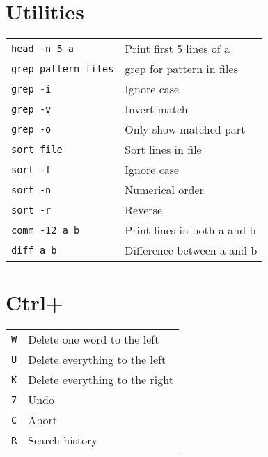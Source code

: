 \documentclass[a4paper, twocolumn]{article}
\renewcommand{\tt}{\texttt}
\begin{document}
\section{Utilities}
\begin{tabular}{ll}
    \tt{head -n 5 a}        & Print first 5 lines of a              \\
    \tt{grep pattern files} & grep for pattern in files             \\
    \tt{grep -i}            & Ignore case                           \\
    \tt{grep -v}            & Invert match                          \\
    \tt{grep -o}            & Only show matched part                \\
    \tt{sort file}          & Sort lines in file                    \\
    \tt{sort -f}            & Ignore case                           \\
    \tt{sort -n}            & Numerical order                       \\
    \tt{sort -r}            & Reverse                               \\
    \tt{comm -12 a b}       & Print lines in both a and b           \\
    \tt{diff a b}           & Difference between a and b
\end{tabular}

\section{Ctrl+}
\begin{tabular}{ll}
    \tt{W} & Delete one word to the left                           \\
    \tt{U} & Delete everything to the left                         \\
    \tt{K} & Delete everything to the right                        \\
    \tt{7} & Undo                                                  \\
    \tt{C} & Abort                                                 \\
    \tt{R} & Search history
\end{tabular}
\end{document}
